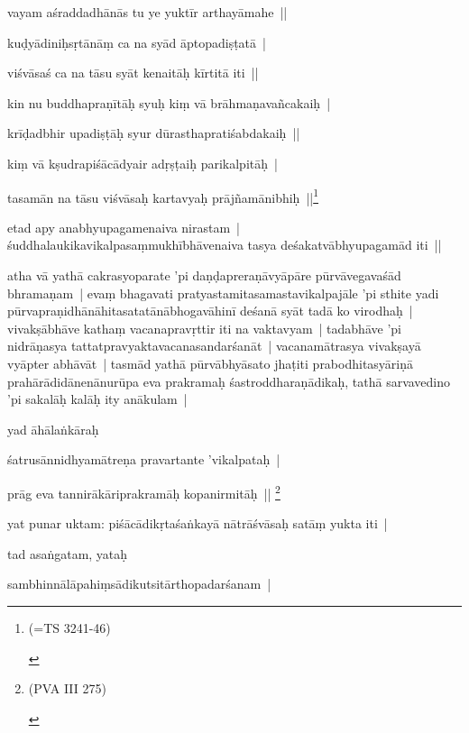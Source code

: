 \documentclass[article,a4paper]{memoir}
\begin{document}
	  \pstart vayam aśraddadhā\-nā\-s tu ye yuktī\-r arthayā\-mahe || 
	\pend
      

	  \pstart kuḍyā\-diniḥsṛtā\-nā\-ṃ ca na syā\-d ā\-ptopadiṣṭatā\- | 
	\pend
      

	  \pstart viśvā\-saś ca na tā\-su syā\-t kenaitā\-ḥ kī\-rtitā\- iti || 
	\pend
      

	  \pstart kin nu buddhapraṇī\-tā\-ḥ syuḥ kiṃ vā\- brā\-hmaṇavañcakaiḥ | 
	\pend
      

	  \pstart krī\-ḍadbhir upadiṣṭā\-ḥ syur dū\-rasthapratiśabdakaiḥ || 
	\pend
      

	  \pstart kiṃ vā\- kṣudrapiśā\-cā\-dyair adṛṣṭaiḥ parikalpitā\-ḥ | 
	\pend
      

	  \pstart tasamā\-n na tā\-su viśvā\-saḥ kartavyaḥ prā\-jñamā\-nibhiḥ ||\footnote{\begin{english}(=TS 3241-46)\end{english}}
	\pend
      

	  \pstart etad apy anabhyupagamenaiva nirastam | śuddhalaukikavikalpasaṃmukhī\-bhā\-venaiva tasya deśakatvā\-bhyupagamā\-d iti || 
	\pend
      

	  \pstart atha vā\- yathā\- cakrasyoparate 'pi daṇḍapreraṇā\-vyā\-pā\-re pū\-rvā\-vegavaśā\-d bhramaṇam | evaṃ bhagavati pratyastamitasamastavikalpajā\-le 'pi sthite yadi pū\-rvapraṇidhā\-nā\-hitasatatā\-nā\-bhogavā\-hinī\- deśanā\- syā\-t tadā\- ko virodhaḥ | vivakṣā\-bhā\-ve kathaṃ vacanapravṛttir iti na vaktavyam | tadabhā\-ve 'pi nidrā\-ṇasya tattatpravyaktavacanasandarśanā\-t | vacanamā\-trasya vivakṣayā\- vyā\-pter abhā\-vā\-t | tasmā\-d yathā\- pū\-rvā\-bhyā\-sato jhaṭiti prabodhitasyā\-riṇā\- prahā\-rā\-didā\-nenā\-nurū\-pa eva prakramaḥ śastroddharaṇā\-dikaḥ, tathā\- sarvavedino 'pi sakalā\-ḥ kalā\-ḥ ity anā\-kulam | 
	\pend
      

	  \pstart yad ā\-hā\-laṅkā\-raḥ 
	\pend
      

	  \pstart śatrusā\-nnidhyamā\-treṇa pravartante 'vikalpataḥ | 
	\pend
      

	  \pstart prā\-g eva tannirā\-kā\-riprakramā\-ḥ kopanirmitā\-ḥ || \footnote{\begin{english}(PVA III 275)\end{english}}
	\pend
      

	  \pstart yat punar uktam: piśā\-cā\-dikṛtaśaṅkayā\- nā\-trā\-śvā\-saḥ satā\-ṃ yukta iti | 
	\pend
      

	  \pstart tad asaṅgatam, yataḥ 
	\pend
      

	  \pstart sambhinnā\-lā\-pahiṃsā\-dikutsitā\-rthopadarśanam | 
	\pend
      
\end{document}
